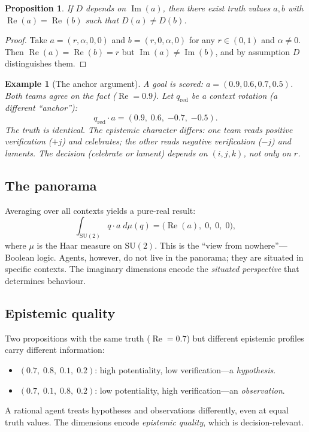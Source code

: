 \documentclass[11pt,a4paper]{article}
\newtheorem{proposition}[theorem]{Proposition}
\newtheorem{example}[theorem]{Example}
\newcommand{\Real}{\operatorname{Re}}
\newcommand{\Imag}{\operatorname{Im}}
\newcommand{\SU}{\mathrm{SU}(2)}
\begin{document}
\begin{proposition}
\label{prop:distinguish}
If $D$ depends on $\Imag(a)$, then there exist truth values $a,b$
with $\Real(a)=\Real(b)$ such that $D(a)\neq D(b)$.
\end{proposition}

\begin{proof}
Take $a=(r,\alpha,0,0)$ and $b=(r,0,\alpha,0)$ for any
$r\in(0,1)$ and $\alpha\neq0$. Then $\Real(a)=\Real(b)=r$
but $\Imag(a)\neq\Imag(b)$, and by assumption $D$ distinguishes them.
\end{proof}

\begin{example}[The anchor argument]
\label{ex:football}
A goal is scored: $a=(0.9,0.6,0.7,0.5)$. Both teams agree on the
fact ($\Real=0.9$). Let $q_{\mathrm{red}}$ be a context rotation
(a different ``anchor''):
\[
  q_{\mathrm{red}}\cdot a = (0.9,\;0.6,\;{-0.7},\;{-0.5}).
\]
The truth is identical. The epistemic character differs: one team
reads positive verification ($+j$) and celebrates; the other reads
negative verification ($-j$) and laments. The decision (celebrate
or lament) depends on $(i,j,k)$, not only on $r$.
\end{example}

\subsection{The panorama}

Averaging over all contexts yields a pure-real result:
\[
  \int_{\SU} q\cdot a\;d\mu(q)
  = \bigl(\Real(a),\;0,\;0,\;0\bigr),
\]
where $\mu$ is the Haar measure on $\SU$. This is the
``view from nowhere''---Boolean logic. Agents, however, do
not live in the panorama; they are situated in specific contexts.
The imaginary dimensions encode the \emph{situated perspective}
that determines behaviour.

\subsection{Epistemic quality}

Two propositions with the same truth ($\Real=0.7$) but different
epistemic profiles carry different information:
\begin{itemize}[nosep]
\item $(0.7,\;0.8,\;0.1,\;0.2)$: high potentiality, low
  verification---a \emph{hypothesis}.
\item $(0.7,\;0.1,\;0.8,\;0.2)$: low potentiality, high
  verification---an \emph{observation}.
\end{itemize}
A rational agent treats hypotheses and observations differently,
even at equal truth values. The dimensions encode
\emph{epistemic quality}, which is decision-relevant.
\end{document}
